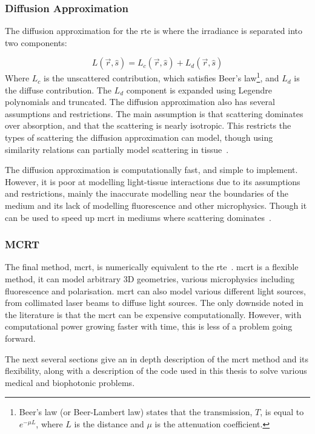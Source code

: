 \subsubsection*{Diffusion Approximation}
\label{sec:diffusionapprox}
The diffusion approximation for the \gls*{rte} is where the irradiance is separated into two components:

\begin{equation}
	L(\vec{r},\hat{s}) = L_c(\vec{r},\hat{s}) + L_d(\vec{r},\hat{s})
\end{equation}
Where $L_c$ is the unscattered contribution, which satisfies Beer's law\footnote{Beer's law (or Beer-Lambert law) states that the transmission, $T$, is equal to $e^{-\mu L}$, where $L$ is the distance and $\mu$ is the attenuation coefficient.}, and $L_d$ is the diffuse contribution. The $L_d$ component is expanded using Legendre polynomials and truncated. 
The diffusion approximation also has several assumptions and restrictions. The main assumption is that scattering dominates over absorption, and that the scattering is nearly isotropic. This restricts the types of scattering the diffusion approximation can model, though using similarity relations can partially model scattering in tissue~\cite{graaff1993similarity,yoon1989accuracies}.

The diffusion approximation is computationally fast, and simple to implement. However, it is poor at modelling light-tissue interactions due to its assumptions and restrictions, mainly the inaccurate modelling near the boundaries of the medium and its lack of modelling fluorescence and other microphysics. Though it can be used to speed up \gls*{mcrt} in mediums where scattering dominates~\cite{robitaille2010modified,min2009radiative}.

\subsubsection*{MCRT}
The final method, \gls*{mcrt}, is numerically equivalent to the \gls*{rte}~\cite{wang2012biomedical}. \gls*{mcrt} is a flexible method, it can model arbitrary 3D geometries, various microphysics including fluorescence and polarisation.
\Gls*{mcrt} can also model various different light sources, from collimated laser beams to diffuse light sources. The only downside noted in the literature is that the \gls*{mcrt} can be expensive computationally. However, with computational power growing faster with time, this is less of a problem going forward. 

The next several sections give an in depth description of the \gls*{mcrt} method and its flexibility, along with a description of the code used in this thesis to solve various medical and biophotonic problems.

